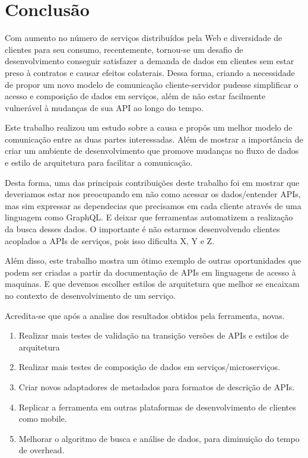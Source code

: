 \chapter{Conclusão}

Com aumento no número de serviços distribuídos pela Web e diversidade de clientes para seu consumo, recentemente, tornou-se um desafio de desenvolvimento conseguir satisfazer a demanda de dados em clientes sem estar preso à contratos e causar efeitos colaterais. Dessa forma, criando a necessidade de propor um novo modelo de comunicação cliente-servidor pudesse simplificar o acesso e composição de dados em serviços, além de não estar facilmente vulnerável à mudanças de sua API ao longo do tempo.

Este trabalho realizou um estudo sobre a causa e propôs um melhor modelo de comunicação entre as duas partes interessadas. Além de mostrar a importância de criar um ambiente de desenvolvimento que promove mudanças no fluxo de dados e estilo de arquitetura para facilitar a comunicação.

Desta  forma,  uma  das principais contribuições deste trabalho foi em mostrar que deveriamos estar nos preocupando em não como acessar os dados/entender APIs, mas sim expressar as dependecias que precisamos em cada cliente através de uma linguagem como GraphQL. E deixar que ferramentas automatizem a realização da busca desses dados. O importante é não estarmos desenvolvendo clientes acoplados a APIs de serviços, pois isso dificulta X, Y e Z.

Além disso, este trabalho mostra um ótimo exemplo de outras oportunidades que podem ser criadas a partir da documentação de APIs em linguagens de acesso à maquinas. E que devemos escolher estilos de arquitetura que melhor se encaixam no contexto de desenvolvimento de um serviço. 




Acredita-se que após a analise dos resultados obtidos pela ferramenta, novas.

\begin{enumerate}
\item Realizar mais testes de validação na transição versões de APIs e estilos de arquitetura
\item Realizar mais testes de composição de dados em serviços/microserviços.
\item Criar novos adaptadores de metadados para formatos de descrição de APIs.
\item Replicar a ferramenta em outras plataformas de desenvolvimento de clientes como mobile.
\item Melhorar o algoritmo de busca e análise de dados, para diminuição do tempo de overhead.
\end{enumerate}

